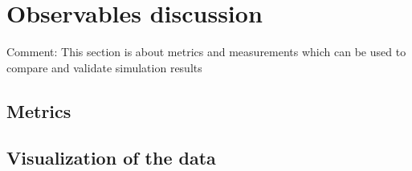 \section{Observables discussion}
Comment: This section is about metrics and measurements which can be used to compare and validate simulation results

\subsection{Metrics}

\subsection{Visualization of the data}

